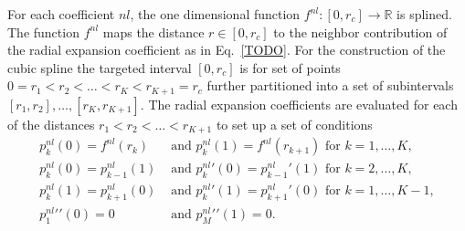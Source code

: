 For each coefficient $nl$, the one dimensional function $f^{nl}:[0,r_c]\rightarrow\mathbb{R}$ is splined.
The function $f^{nl}$ maps the distance $r\in[0,r_c]$ to the neighbor contribution of the radial expansion coefficient as in Eq.~\ref{TODO}.
For the construction of the cubic spline the targeted interval $[0,r_c]$ is for set of points $0 = r_1 < r_2 < \ldots < r_{K} < r_{K+1} = r_c$ further partitioned into a set of subintervals $[r_1, r_2], \ldots, [r_{K}, r_{K+1}]$.
The radial expansion coefficients are evaluated for each of the distances $r_1 < r_2 < \ldots < r_{K+1}$ to set up a set of conditions
\begin{subequations}
\begin{align} 
    p^{nl}_{k}(0) = f^{nl}(r_k)&\text{ and } p^{nl}_{k}(1) =  f^{nl}(r_{k+1})\text{ for } k=1,\ldots,K , \label{eq:function_boundary_conditions}\\
    p^{nl}_{k}(0) = p^{nl}_{k-1}(1)&\text{ and } p^{nl}_{k}\prime(0)= p^{nl}_{k-1}\prime(1) \text{ for } k=2,\ldots,K  ,\label{eq:points_boundary_conditions}\\
    p^{nl}_k(1) = p^{nl}_{k+1}(0)&\text{ and }  p^{nl}_k\prime(1) = p^{nl}_{k+1}\prime(0) \text{ for } k=1,\ldots,K-1 ,\label{eq:derivative_boundary_conditions}\\
    p^{nl}_{1}\prime\prime(0) = 0&\text{ and } p^{nl}_{M}\prime\prime(1) = 0.\label{eq:natural_boundary_conditions}
\end{align}
\end{subequations}
